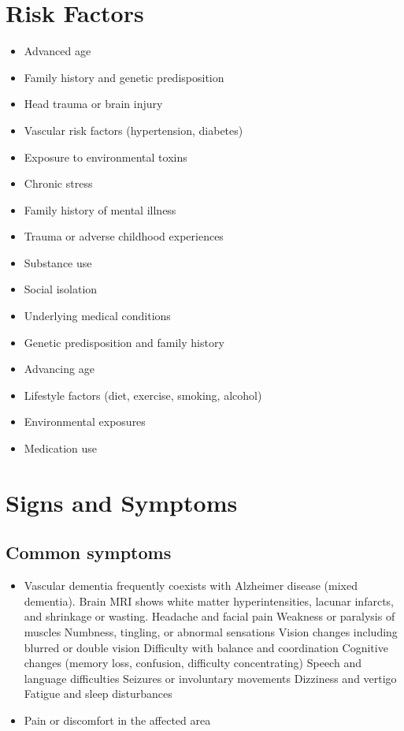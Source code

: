 \section{Risk Factors}


\begin{itemize}[noitemsep]
  \item Advanced age
  \item Family history and genetic predisposition
  \item Head trauma or brain injury
  \item Vascular risk factors (hypertension, diabetes)
  \item Exposure to environmental toxins
  \item Chronic stress
  \item Family history of mental illness
  \item Trauma or adverse childhood experiences
  \item Substance use
  \item Social isolation
  \item Underlying medical conditions
  \item Genetic predisposition and family history
  \item Advancing age
  \item Lifestyle factors (diet, exercise, smoking, alcohol)
  \item Environmental exposures
  \item Medication use
\end{itemize}
\section{Signs and Symptoms}

\subsection{Common symptoms}
\begin{itemize}[noitemsep]
  \item Vascular dementia frequently coexists with Alzheimer disease (mixed dementia). Brain MRI shows white matter hyperintensities, lacunar infarcts, and shrinkage or wasting. Headache and facial pain Weakness or paralysis of muscles Numbness, tingling, or abnormal sensations Vision changes including blurred or double vision Difficulty with balance and coordination Cognitive changes (memory loss, confusion, difficulty concentrating) Speech and language difficulties Seizures or involuntary movements Dizziness and vertigo Fatigue and sleep disturbances
  \item Pain or discomfort in the affected area
  \end{itemize}

